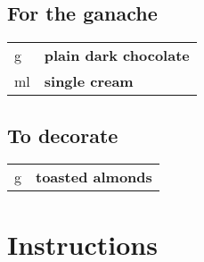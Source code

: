 \documentclass[main.tex]{subfiles}
\begin{document}
\subsection{For the ganache}
\vspace*{-\baselineskip}
\begin{table}[ht]
	\begin{tabularx}{\textwidth}{>{\hsize=0.333\hsize}X>{\bf\hsize=1\hsize}X}
	\unit[100]{g} & plain dark chocolate\\
	\unit[100]{ml} & single cream\\
	\end{tabularx}
\end{table}

\subsection{To decorate}
\vspace*{-\baselineskip}
\begin{table}[ht]
	\begin{tabularx}{\textwidth}{>{\hsize=0.333\hsize}X>{\bf\hsize=1\hsize}X}
	\unit[65]{g} & toasted almonds\\
	\end{tabularx}
\end{table}

\section{Instructions}
\end{document}
